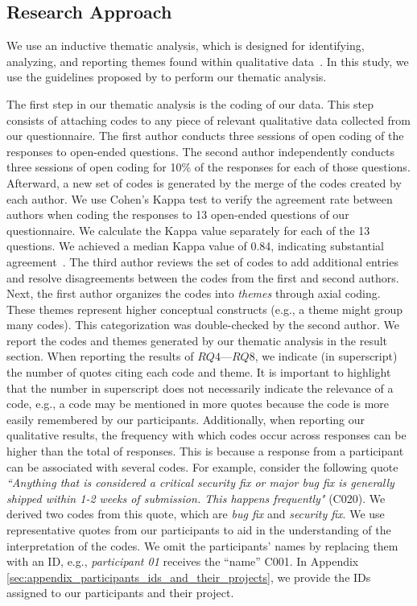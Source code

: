\subsection{Research Approach}
\label{sec:research_approach}

We use an inductive thematic analysis, which is designed for identifying, analyzing, and reporting themes found within qualitative data~\citep{braun2006using}. In this study, we use the guidelines proposed by \cite{nowell2017thematic} to perform our thematic analysis.

The first step in our thematic analysis is the coding of our data. This step consists of attaching codes to any piece of relevant qualitative data collected from our questionnaire. The first author conducts three sessions of open coding of the responses to open-ended questions. The second author independently conducts three sessions of open coding for 10\% of the responses for each of those questions. Afterward, a new set of codes is generated by the merge of the codes created by each author. 
We use Cohen's Kappa test to verify the agreement rate between authors when coding the responses to 13 open-ended questions of our questionnaire.
We calculate the Kappa value separately for each of the 13 questions. We achieved a median Kappa value of 0.84, indicating substantial agreement~\citep{landis1977kappa}. 
The third author reviews the set of codes to add additional entries and resolve disagreements between the codes from the first and second authors. 
Next, the first author organizes the codes into {\em themes} through axial coding. These themes represent higher conceptual constructs (e.g., a theme might group many codes). 
This categorization was double-checked by the second author. 
We report the codes and themes generated by our thematic analysis in the result section. When reporting the results of $RQ4$---$RQ8$, we indicate (in superscript) the number of quotes citing each code and theme. It is important to highlight that the number in superscript does not necessarily indicate the relevance of a code, e.g., a code may be mentioned in more quotes because the code is more easily remembered by our participants. 
Additionally, when reporting our qualitative results, the frequency with which codes occur across responses can be higher than the total of responses. This is because a response from a participant can be associated with several codes. For example, consider the following quote \textit{``Anything that is considered a critical security fix or major bug fix is generally shipped within 1-2 weeks of submission. This happens frequently"} (C020). We derived two codes from this quote, which are \textit{bug fix} and \textit{security fix}.
We use representative quotes from our participants to aid in the understanding of the interpretation of the codes. 
We omit the participants' names by replacing them with an ID, e.g., {\em participant 01} receives the ``name'' C001. In Appendix \ref{sec:appendix_participants_ids_and_their_projects}, we provide the IDs assigned to our participants and their project. 


